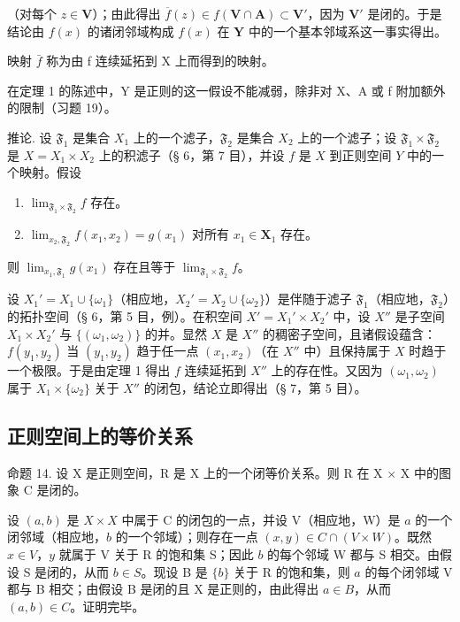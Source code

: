 （对每个 \(z \in \mathbf{V}\)）；由此得出 \(\overline{f}(z) \in f(\mathbf{V} \cap \mathbf{A}) \subset \mathbf{V}'\)，因为 \(\mathbf{V}'\) 是闭的。于是结论由 \(f(x)\) 的诸闭邻域构成 \(f(x)\) 在 \(\mathbf{Y}\) 中的一个基本邻域系这一事实得出。

映射 \(\bar{f}\) 称为由 f 连续延拓到 X 上而得到的映射。

在定理 1 的陈述中，Y 是正则的这一假设不能减弱，除非对 X、A 或 f 附加额外的限制（习题 19）。

推论. 设 \(\mathfrak{F}_1\) 是集合 \(X_1\) 上的一个滤子，\(\mathfrak{F}_2\) 是集合 \(X_2\) 上的一个滤子；设 \(\mathfrak{F}_1 \times \mathfrak{F}_2\) 是 \(X = X_1 \times X_2\) 上的积滤子（§ 6，第 7 目），并设 \(f\) 是 \(X\) 到正则空间 \(Y\) 中的一个映射。假设

\begin{enumerate}
\def\labelenumi{\alph{enumi})}
\item
  \(\lim_{\mathfrak{F}_1\times \mathfrak{F}_2}f\) 存在。
\item
  \(\lim_{x_2, \mathfrak{F}_2} f(x_1, x_2) = g(x_1)\) 对所有 \(x_1 \in \mathbf{X}_1\) 存在。
\end{enumerate}

则 \(\lim_{x_1, \mathfrak{F}_1} g(x_1)\) 存在且等于 \(\lim_{\mathfrak{F}_1 \times \mathfrak{F}_2} f\)。

设 \(X_1' = X_1 \cup \{ \omega_1 \}\)（相应地，\(X_2' = X_2 \cup \{ \omega_2 \}\)）是伴随于滤子 \(\mathfrak{F}_1\)（相应地，\(\mathfrak{F}_2\)）的拓扑空间（§ 6，第 5 目，例）。在积空间 \(X' = X_1' \times X_2'\) 中，设 \(X''\) 是子空间 \(X_1 \times X_2'\) 与 \(\{ (\omega_1, \omega_2) \}\) 的并。显然 \(X\) 是 \(X''\) 的稠密子空间，且诸假设蕴含：\(f(y_1, y_2)\) 当 \((y_1, y_2)\) 趋于任一点 \((x_1, x_2)\)（在 \(X''\) 中）且保持属于 \(X\) 时趋于一个极限。于是由定理 1 得出 \(f\) 连续延拓到 \(X''\) 上的存在性。又因为 \((\omega_1, \omega_2)\) 属于 \(X_1 \times \{ \omega_2 \}\) 关于 \(X''\) 的闭包，结论立即得出（§ 7，第 5 目）。

\subsection{正则空间上的等价关系}

命题 14. 设 X 是正则空间，R 是 X 上的一个闭等价关系。则 R 在 X × X 中的图象 C 是闭的。

设 \((a, b)\) 是 \(X \times X\) 中属于 C 的闭包的一点，并设 V（相应地，W）是 \(a\) 的一个闭邻域（相应地，\(b\) 的一个邻域）；则存在一点 \((x, y) \in C \cap (V \times W)\)。既然 \(x \in V\)，\(y\) 就属于 V 关于 R 的饱和集 S；因此 \(b\) 的每个邻域 W 都与 S 相交。由假设 S 是闭的，从而 \(b \in S\)。现设 B 是 \(\{b\}\) 关于 R 的饱和集，则 \(a\) 的每个闭邻域 V 都与 B 相交；由假设 B 是闭的且 X 是正则的，由此得出 \(a \in B\)，从而 \((a, b) \in C\)。证明完毕。

